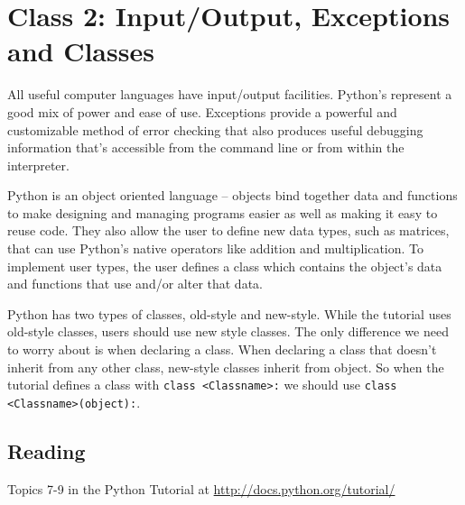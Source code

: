 \documentclass{report}
\begin{document}
\section{Class 2: Input/Output, Exceptions and Classes}
All useful computer languages have input/output facilities. Python's represent a good mix of power and ease of use. Exceptions provide a powerful and customizable method of error checking that also produces useful debugging information that's accessible from the command line or from within the interpreter.

Python is an object oriented language -- objects bind together data and functions to make designing and managing programs easier as well as making it easy to reuse code. They also allow the user to define new data types, such as matrices, that can use Python's native operators like addition and multiplication. To implement user types, the user defines a \gls{class} which contains the object's data and functions that use and/or alter that data.

Python has two types of classes, old-style and new-style. While the tutorial uses old-style classes, users should use new style classes. The only difference we need to worry about is when declaring a class. When declaring a class that doesn't inherit from any other class, new-style classes inherit from object. So when the tutorial defines a class with \verb|class <Classname>:| we should use \verb|class <Classname>(object):|.

\subsection{Reading}
Topics 7-9 in the Python Tutorial at \url{http://docs.python.org/tutorial/} \cite{website:Python272docs}
\end{document}
